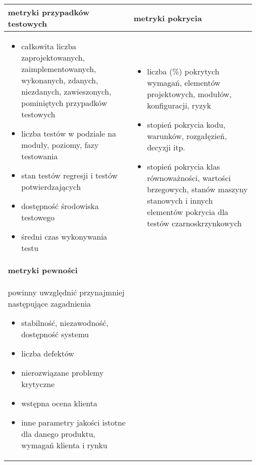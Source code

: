 \documentclass[../main.tex]{subfiles}
\begin{document}
    \begin{table}[H]
        \begin{center}
            \begin{tabular}{| p{8cm} | p{8cm} |}
                \hline
                \textbf{metryki przypadków testowych} & \textbf{metryki pokrycia} \\
                \hline
                \begin{itemize}
                    \item całkowita liczba zaprojektowanych, zaimplementowanych, wykonanych, zdanych, niezdanych, zawieszonych, pominiętych przypadków testowych
                    \item liczba testów w podziale na moduły, poziomy, fazy testowania
                    \item stan testów regresji i testów potwierdzających
                    \item dostępność środowiska testowego
                    \item średni czas wykonywania testu
                \end{itemize}
                &
                \begin{itemize}
                    \item liczba (\%) pokrytych wymagań, elementów projektowych, modułów, konfiguracji, ryzyk
                    \item stopień pokrycia kodu, warunków, rozgałęzień, decyzji itp.
                    \item stopień pokrycia klas równoważności, wartości brzegowych, stanów maszyny stanowych i innych elementów pokrycia dla testów czarnoskrzynkowych
                \end{itemize} \\
                \hline
                \hline
                \textbf{metryki pewności}             &                           \\
                \hline
                powinny uwzględnić przynajmniej następujące zagadnienia
                \begin{itemize}
                    \item stabilność, niezawodność, dostępność systemu
                    \item liczba defektów
                    \item nierozwiązane problemy krytyczne
                    \item wstępna ocena klienta
                    \item inne parametry jakości istotne dla danego produktu, wymagań klienta i rynku
                \end{itemize}                         &                           \\
                \hline
            \end{tabular}
        \end{center}
    \end{table}
\end{document}
